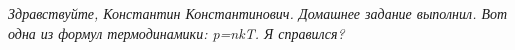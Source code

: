 \documentclass[10pt, a4paper]{scrartcl}
\begin{document}
	\textit{Здравствуйте, Константин Константинович. Домашнее задание выполнил. Вот одна из формул термодинамики: p=nkT. Я справился?}
\end{document}
